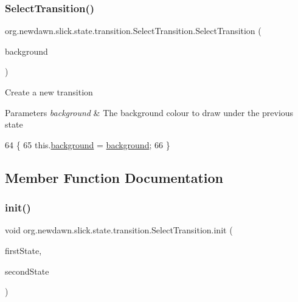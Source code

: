 \subsubsection{\texorpdfstring{Select\+Transition()}{SelectTransition()}\hspace{0.1cm}{\footnotesize\ttfamily [2/2]}}
{\footnotesize\ttfamily org.\+newdawn.\+slick.\+state.\+transition.\+Select\+Transition.\+Select\+Transition (\begin{DoxyParamCaption}\item[{\mbox{\hyperlink{classorg_1_1newdawn_1_1slick_1_1_color}{Color}}}]{background }\end{DoxyParamCaption})\hspace{0.3cm}{\ttfamily [inline]}}

Create a new transition


\begin{DoxyParams}{Parameters}
{\em background} & The background colour to draw under the previous state \\
\hline
\end{DoxyParams}

\begin{DoxyCode}
64                                               \{
65         this.\mbox{\hyperlink{classorg_1_1newdawn_1_1slick_1_1state_1_1transition_1_1_select_transition_ada67cc158242a846499be282dfa2c53b}{background}} = \mbox{\hyperlink{classorg_1_1newdawn_1_1slick_1_1state_1_1transition_1_1_select_transition_ada67cc158242a846499be282dfa2c53b}{background}};
66     \}
\end{DoxyCode}


\subsection{Member Function Documentation}
\mbox{\label{classorg_1_1newdawn_1_1slick_1_1state_1_1transition_1_1_select_transition_aead0953842e8e95346fb683d5825887d}} 
\subsubsection{\texorpdfstring{init()}{init()}}
{\footnotesize\ttfamily void org.\+newdawn.\+slick.\+state.\+transition.\+Select\+Transition.\+init (\begin{DoxyParamCaption}\item[{\mbox{\hyperlink{interfaceorg_1_1newdawn_1_1slick_1_1state_1_1_game_state}{Game\+State}}}]{first\+State,  }\item[{\mbox{\hyperlink{interfaceorg_1_1newdawn_1_1slick_1_1state_1_1_game_state}{Game\+State}}}]{second\+State }\end{DoxyParamCaption})\hspace{0.3cm}{\ttfamily [inline]}}

